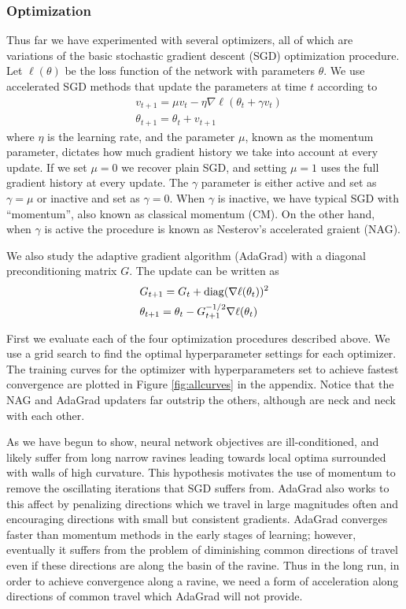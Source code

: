 \subsubsection*{Optimization}

Thus far we have experimented with several optimizers, all of which are
variations of the basic stochastic gradient descent (SGD) optimization
procedure. Let $\ell(\theta)$ be the loss function of the network with
parameters $\theta$. We use accelerated SGD methods that update the parameters
at time $t$ according to
\begin{align*}
&v_{t+1} = \mu v_t - \eta \nabla \ell (\theta_t + \gamma v_t) \\
&\theta_{t+1} = \theta_t + v_{t+1}
\end{align*}
where $\eta$ is the learning rate, and the parameter $\mu$, known as the momentum
parameter, dictates how much gradient history we take into account at every
update. If we set $\mu = 0$ we recover plain SGD, and setting $\mu = 1$ uses
the full gradient history at every update.  The $\gamma$ parameter is either
active and set as $\gamma = \mu$ or inactive and set as $\gamma = 0$.  When
$\gamma$ is inactive, we have typical SGD with ``momentum'', also known as
classical momentum (CM). On the other hand, when $\gamma$ is active the
procedure is known as Nesterov's accelerated graient (NAG).

We also study the adaptive gradient algorithm (AdaGrad) with a diagonal
preconditioning matrix $G$. The update can be written as
\begin{align*}
&G_{t+1} = G_{t} + \operatorname*{diag}(\nabla \ell (\theta_t))^2 \\
&\theta_{t+1} = \theta_t - G_{t+1}^{-1/2} \nabla \ell(\theta_t)
\end{align*} 

First we evaluate each of the four optimization procedures described above. We
use a grid search to find the optimal hyperparameter settings for each
optimizer. The training curves for the optimizer with hyperparameters set to
achieve fastest convergence are plotted in Figure \ref{fig:allcurves} in the
appendix. Notice that the NAG and AdaGrad updaters far outstrip the others,
although are neck and neck with each other.

As we have begun to show, neural network objectives are ill-conditioned, and likely 
suffer from long narrow ravines leading towards local optima surrounded with
walls of high curvature. This hypothesis motivates the use of momentum to remove the
oscillating iterations that SGD suffers from. AdaGrad also works to this affect
by penalizing directions which we travel in large magnitudes often and
encouraging directions with small but consistent gradients. AdaGrad converges
faster than momentum methods in the early stages of learning; however,
eventually it suffers from the problem of diminishing common directions of travel
even if these directions are along the basin of the ravine. Thus in the long
run, in order to achieve convergence along a ravine, we need a form of
acceleration along directions of common travel which AdaGrad will not provide. 

